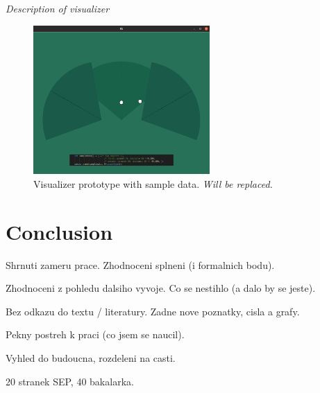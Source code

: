 {\it Description of visualizer}

\begin{figure}[h!]
\begin{center}
\includegraphics[width=0.6\textwidth]{obrazky-figures/visualizer.png}
\caption{Visualizer prototype with sample data. {\it Will be replaced.} \label{fig:visualizer}}
\end{center}
\end{figure}






\chapter{Conclusion}
Shrnuti zameru prace. Zhodnoceni splneni (i formalnich bodu).

Zhodnoceni z pohledu dalsiho vyvoje. Co se nestihlo (a dalo by se jeste).

Bez odkazu do textu / literatury. Zadne nove poznatky, cisla a grafy.

Pekny postreh k praci (co jsem se naucil).

Vyhled do budoucna, rozdeleni na casti.

20 stranek SEP, 40 bakalarka.




